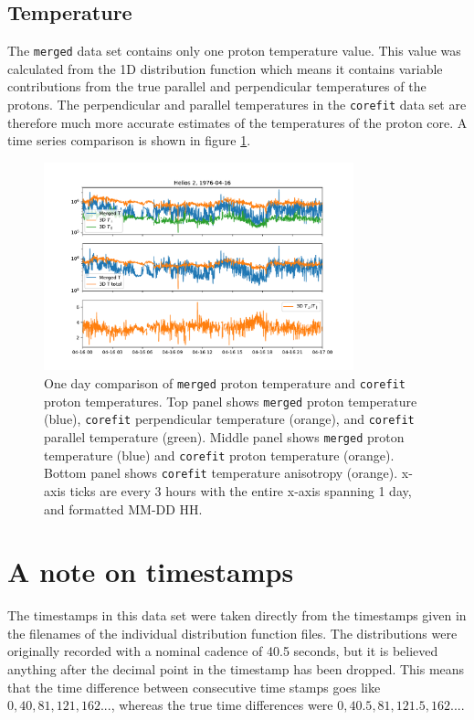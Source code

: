 \documentclass[11pt,a4paper]{article}
\begin{document}
\subsection{Temperature}
The \texttt{merged} data set contains only one proton temperature value. This value was calculated from the 1D distribution function which means it contains variable contributions from the true parallel and perpendicular temperatures of the protons. The perpendicular and parallel temperatures in the \texttt{corefit} data set are therefore much more accurate estimates of the temperatures of the proton core. A time series comparison is shown in figure \ref{fig:temperature}.
\begin{figure}
	\centering
	\includegraphics[width=0.8\textwidth]{temperature_comparision}
	\caption{One day comparison of \texttt{merged} proton temperature and \texttt{corefit} proton temperatures. Top panel shows \texttt{merged} proton temperature (blue), \texttt{corefit} perpendicular temperature (orange), and \texttt{corefit} parallel temperature (green). Middle panel shows \texttt{merged} proton temperature (blue) and \texttt{corefit} proton temperature (orange). Bottom panel shows \texttt{corefit} temperature anisotropy (orange). x-axis ticks are every 3 hours with the entire x-axis spanning 1 day, and formatted MM-DD HH.}
	\label{fig:temperature}
\end{figure}

\section{A note on timestamps}
The timestamps in this data set were taken directly from the timestamps given in the filenames of the individual distribution function files. The distributions were originally recorded with a nominal cadence of 40.5 seconds, but it is believed anything after the decimal point in the timestamp has been dropped. This means that the time difference between consecutive time stamps goes like $0, 40, 81, 121, 162...$, whereas the true time differences were $0, 40.5, 81, 121.5, 162...$.
\appendix
\end{document}

